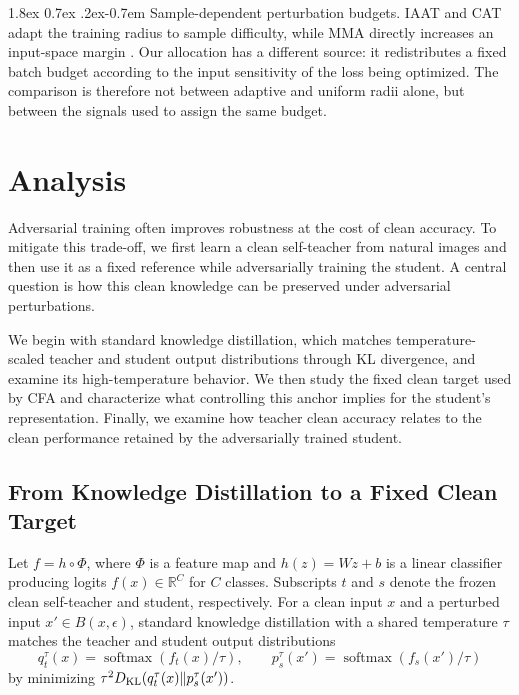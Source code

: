 \documentclass{article} %
\makeatletter
\theoremstyle{plain}
\renewcommand{\paragraph}{\@startsection{paragraph}{4}{\z@}%
  {1.8ex \@plus 0.7ex \@minus .2ex}{-0.7em}%
  {\normalfont\normalsize\bfseries}}
\makeatother
\begin{document}
\paragraph{Sample-dependent perturbation budgets.}
IAAT and CAT adapt the training radius to sample difficulty, while MMA directly increases an
input-space margin \citep{iaat,cat,mma}. Our allocation has a different source: it redistributes a
fixed batch budget according to the input sensitivity of the loss being optimized. The comparison is
therefore not between adaptive and uniform radii alone, but between the signals used to assign the
same budget.


\section{Analysis}
\label{sec:analysis}

Adversarial training often improves robustness at the cost of clean accuracy.
To mitigate this trade-off, we first learn a clean self-teacher from natural
images and then use it as a fixed reference while adversarially training the
student. A central question is how this clean knowledge can be preserved under
adversarial perturbations.

We begin with standard knowledge distillation, which matches
temperature-scaled teacher and student output distributions through KL
divergence, and examine its high-temperature behavior. We then study the
fixed clean target used by CFA and characterize what controlling this anchor
implies for the student's representation. Finally, we examine how teacher
clean accuracy relates to the clean performance retained by the adversarially
trained student.

\subsection{From Knowledge Distillation to a Fixed Clean Target}
\label{sec:fragile}

Let \(f=h\circ\Phi\), where \(\Phi\) is a feature map and
\(h(z)=Wz+b\) is a linear classifier producing logits
\(f(x)\in\mathbb{R}^{C}\) for \(C\) classes. Subscripts \(t\) and \(s\)
denote the frozen clean self-teacher and student, respectively. For a clean
input \(x\) and a perturbed input \(x'\in B(x,\epsilon)\), standard knowledge
distillation with a shared temperature \(\tau\) matches the teacher and student
output distributions
\begin{equation}
q_t^\tau(x)
=
\operatorname{softmax}\!\left(f_t(x)/\tau\right),
\qquad
p_s^\tau(x')
=
\operatorname{softmax}\!\left(f_s(x')/\tau\right)
\end{equation}
by minimizing
\(\tau^2 D_{\rm KL}(q_t^\tau(x)\|p_s^\tau(x'))\).
\end{document}
